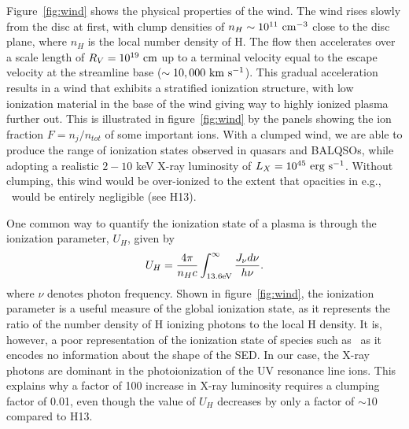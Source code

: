 \documentclass[useAMS,usenatbib]{mn2e_x}
\begin{document}
Figure~\ref{fig:wind} shows the physical properties of the wind.
The wind rises slowly from the disc at first, with clump densities 
of $n_H \sim 10^{11}~\rm{cm^{-3}}$ close to the disc plane, 
where $n_H$ is the local number density of H.
The flow then accelerates over a scale length of $R_V=10^{19}~\rm{cm}$
up to a terminal velocity equal to the escape velocity at the streamline base
($\sim10,000~\rm{km~s^{-1}}$). This gradual acceleration results in
a wind that exhibits a stratified ionization structure, with low ionization material
in the base of the wind giving way to highly ionized plasma further out.
This is illustrated in figure~\ref{fig:wind} 
by the panels showing the ion fraction $F=n_j/n_{tot}$ of some important ions.
With a clumped wind, we are able to produce the range of ionization states observed
in quasars and BALQSOs, while adopting a realistic $2-10$ keV X-ray luminosity
of $L_{X}=10^{45}~\rm{erg~s^{-1}}$. Without clumping, this wind would be over-ionized 
to the extent that opacities in e.g., \civ\ would be entirely negligible (see H13).

One common way to quantify the ionization state of a plasma
is through the ionization parameter, $U_H$, given by
\begin{equation}
U_H = \frac{4\pi}{n_H c}\int_{13.6{\rm{eV}}}^{\infty}\frac{{J_{\nu}d\nu}}{h\nu}.
\end{equation}
\noindent where $\nu$ denotes photon 
frequency. Shown in figure~\ref{fig:wind},
the ionization parameter is a useful measure of the global ionization state,
as it represents the ratio of the number density of 
H ionizing photons to the local H density.
It is, however, a poor representation of the 
ionization state of species such as \civ\ as it encodes no information
about the shape of the SED. In our case, the X-ray photons 
are dominant in the photoionization of the UV resonance line ions. 
This explains why a factor of 100 increase in X-ray luminosity requires
a clumping factor of 0.01, even though the value of $U_H$ decreases by only a factor of $\sim10$ 
compared to H13. 
\end{document}
